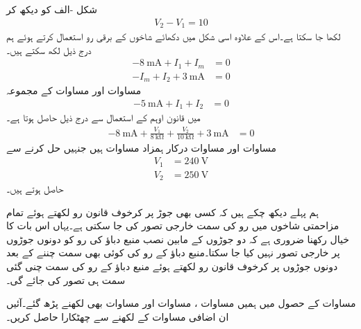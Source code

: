 شکل -الف کو دیکھ کر
\begin{align}\label{مساوات_جوڑ_منبع_دباو_درمیان_جوڑ_الف}
V_2-V_1=10
\end{align}
لکھا جا سکتا ہے۔اس کے علاوہ اسی شکل میں دکھائے شاخوں کے برقی رو استعمال کرتے ہوئے ہم درج ذیل لکھ سکتے ہیں۔
\begin{align}
-\SI{8}{\milli\ampere}+I_1+I_m&=0 \label{مساوات_جوڑ_منبع_دباو_درمیان_جوڑ_ب}\\
-I_m+I_2+\SI{3}{\milli\ampere}&=0 \label{مساوات_جوڑ_منبع_دباو_درمیان_جوڑ_پ}
\end{align}
مساوات  اور مساوات  کے مجموعہ
\begin{align}\label{مساوات_جوڑ_منبع_دباو_درمیان_جوڑ_ت}
-\SI{5}{\milli\ampere}+I_1+I_2&=0
\end{align}
میں قانون اوہم کے استعمال سے درج ذیل حاصل ہوتا ہے۔
\begin{align}\label{مساوات_جوڑ_منبع_دباو_درمیان_جوڑ_ٹ}
-\SI{8}{\milli\ampere}+\frac{V_1}{\SI{8}{\kilo\ohm}}+\frac{V_2}{\SI{10}{\kilo\ohm}}+\SI{3}{\milli\ampere}&=0
\end{align}
مساوات  اور مساوات  درکار ہمزاد مساوات ہیں جنہیں حل کرنے سے
\begin{align*}
V_1&=\SI{240}{\volt}\\
V_2&=\SI{250}{\volt}
\end{align*}
حاصل ہوتے ہیں۔

ہم پہلے دیکھ چکے ہیں کہ کسی بھی جوڑ پر کرخوف قانون رو لکھتے ہوئے تمام مزاحمتی شاخوں میں رو کی سمت خارجی تصور کی جا سکتی ہے۔یہاں اس بات کا خیال رکھنا ضروری ہے کہ دو جوڑوں کے مابین نصب منبع دباؤ کی رو کو دونوں جوڑوں پر خارجی تصور نہیں کیا جا سکتا۔منبع دباؤ کے رو کی کوئی بھی سمت چننے کے بعد دونوں جوڑوں پر کرخوف قانون رو لکھتے ہوئے  منبع دباؤ کے رو کی  سمت چنی گئی سمت ہی تصور کی جائے گی۔

 مساوات  کے حصول میں ہمیں مساوات ، مساوات  اور مساوات  بھی لکھنے پڑھ گئے۔آئیں ان اضافی مساوات کے لکھنے سے چھٹکارا حاصل کریں۔

